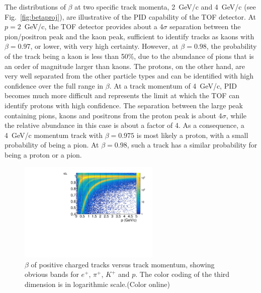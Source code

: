 The distributions of $\beta$ at two specific track momenta, 2~GeV/c and 4~GeV/c (see Fig.~\ref{fig:betaproj}), are illustrative of the PID capability of the TOF detector. At $p=2$~GeV/c, the TOF detector provides about a 4$\sigma$ separation between
the pion/positron peak and the kaon peak, sufficient to identify tracks as kaons with $\beta=0.97$, or lower, with very
high certainty. However, at  $\beta=0.98$, the probability of the track being a kaon is less than 50\%, due to the abundance of pions that is an order of magnitude larger than kaons. The protons, on the other hand, are very well
separated from the other particle types and can be identified with high confidence over the full range in $\beta$.
At a track momentum of 4~GeV/c, PID becomes much more difficult and represents the limit at which the TOF can identify protons with high confidence. The separation between the large peak containing pions, kaons and positrons from the proton
peak is about 4$\sigma$, while the relative abundance in this case is about a factor of 4. As a consequence, a 4~GeV/c momentum
track with $\beta=0.975$ is most likely a proton, with a small probability of being a pion. At $\beta=0.98$, such
a track has a similar probability for being a proton or a pion.
\begin{figure}[tbp]
\begin{center}
\includegraphics[width=0.6\textwidth]{figures/beta_vs_p_positivetracks.pdf}
\caption{\label{fig:betavsp}$\beta$ of positive charged tracks versus track momentum, showing obvious bands for $e^+$, $\pi^+$, $K^+$ and $p$. The color coding of the third dimension
is in logarithmic scale.(Color online)}
\end{center}
\end{figure}

